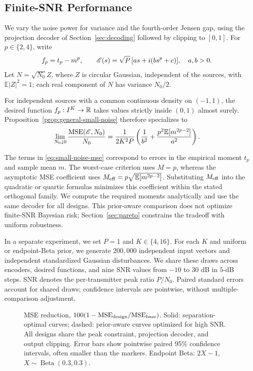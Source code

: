 \subsection{Finite-SNR Performance}\label{sec:finite-noise}
We vary the noise power for variance and the fourth-order Jensen gap, using the projection decoder of Section~\ref{sec:decoding} followed by clipping to $[0,1]$. For $p\in\{2,4\}$, write
$$
 f_p=t_p-m^p,\qquad
 \mathscr E(s)=\sqrt P\,[as+i(bs^p+c)],\quad a,b>0.
$$
Let $N=\sqrt{N_0}Z$, where $Z$ is circular Gaussian, independent of the sources, with $\mathbb E|Z|^2=1$; each real component of $N$ has variance $N_0/2$.

For independent sources with a common continuous density on $(-1,1)$, the desired function $f_p:I^K\to\mathbb R$ takes values strictly inside $(0,1)$ almost surely. Proposition~\ref{prop:general-small-noise} therefore specializes to
\begin{equation}
 \lim_{N_0\downarrow0}\frac{\operatorname{MSE}(\mathscr E,N_0)}{N_0}
 =\frac{1}{2K^2P}\left(\frac{1}{b^2}
 +\frac{p^2\mathbb E[m^{2p-2}]}{a^2}\right).
 \label{eq:small-noise-mse}
\end{equation}


The terms in \eqref{eq:small-noise-mse} correspond to errors in the empirical moment $t_p$ and sample mean $m$. The worst-case criterion uses $M=p$, whereas the asymptotic MSE coefficient uses $M_{\rm eff}=p\sqrt{\mathbb E[m^{2p-2}]}$. Substituting $M_{\rm eff}$ into the quadratic or quartic formulas minimizes this coefficient within the stated orthogonal family. We compute the required moments analytically and use the same decoder for all designs. This prior-aware comparison does not optimize finite-SNR Bayesian risk; Section~\ref{sec:pareto} constrains the tradeoff with uniform robustness.




In a separate experiment, we set $P=1$ and $K\in\{4,16\}$. For each $K$ and uniform or endpoint-Beta prior, we generate $200{,}000$ independent input vectors and independent standardized Gaussian disturbances. We share these draws across encoders, desired functions, and nine SNR values from $-10$ to $30$ dB in $5$-dB steps. SNR denotes the per-transmitter peak ratio $P/N_0$. Paired standard errors account for shared draws; confidence intervals are pointwise, without multiple-comparison adjustment.

\begin{figure}[!t]
 \centering{}
 \caption{MSE reduction, $100(1-\mathrm{MSE}_{\rm design}/\mathrm{MSE}_{\rm base})$. Solid: separation-optimal curves; dashed: prior-aware curves optimized for high SNR. All designs share the peak constraint, projection decoder, and output clipping. Error bars show pointwise paired 95\% confidence intervals, often smaller than the markers. Endpoint Beta: $2X-1$, $X\sim\operatorname{Beta}(0.3,0.3)$.}
 \label{fig:finite-noise}
\end{figure}

